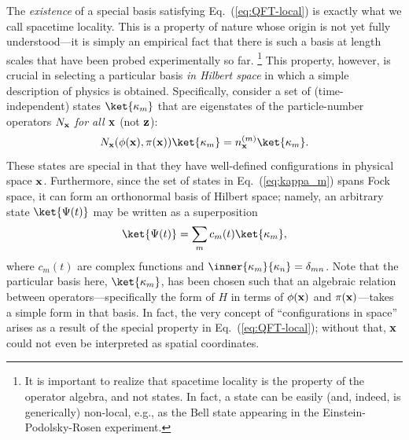 \documentclass[12pt]{article}
\begin{document}
The {\it existence} of a special basis satisfying Eq.~(\ref{eq:QFT-local}) 
is exactly what we call spacetime locality.  This is a property of nature 
whose origin is not yet fully understood---it is simply an empirical 
fact that there is such a basis at length scales that have been probed 
experimentally so far.%
\footnote{It is important to realize that spacetime locality is the 
 property of the operator algebra, and not states.  In fact, a state can 
 be easily (and, indeed, is generically) non-local, e.g., as the Bell 
 state appearing in the Einstein-Podolsky-Rosen experiment.}
This property, however, is crucial in selecting a particular basis {\it 
in Hilbert space} in which a simple description of physics is obtained. 
Specifically, consider a set of (time-independent) states $\ket{\kappa_m}$ 
that are eigenstates of the particle-number operators $N_{\bf x}$ 
{\it for all ${\bf x}$} (not ${\bf z}$):
%
\begin{equation}
  N_{\bf x}(\phi({\bf x}),\pi({\bf x})) \ket{\kappa_m} 
  = n_{\bf x}^{(m)} \ket{\kappa_m}.
\label{eq:kappa_m}
\end{equation}
%
These states are special in that they have well-defined configurations 
in physical space ${\bf x}$.  Furthermore, since the set of states in 
Eq.~(\ref{eq:kappa_m}) spans Fock space, it can form an orthonormal 
basis of Hilbert space; namely, an arbitrary state $\ket{\Psi(t)}$ may 
be written as a superposition
%
\begin{equation}
  \ket{\Psi(t)} = \sum_m c_m(t) \ket{\kappa_m},
\label{eq:Psi-t_gen}
\end{equation}
%
where $c_m(t)$ are complex functions and $\inner{\kappa_m}{\kappa_n} 
= \delta_{mn}$.  Note that the particular basis here, 
$\ket{\kappa_m}$, has been chosen such that an algebraic relation 
between operators---specifically the form of $H$ in terms of 
$\phi({\bf x})$ and $\pi({\bf x})$---takes a simple form in that 
basis.  In fact, the very concept of ``configurations in space'' 
arises as a result of the special property in Eq.~(\ref{eq:QFT-local}); 
without that, ${\bf x}$ could not even be interpreted as spatial 
coordinates.
\end{document}
